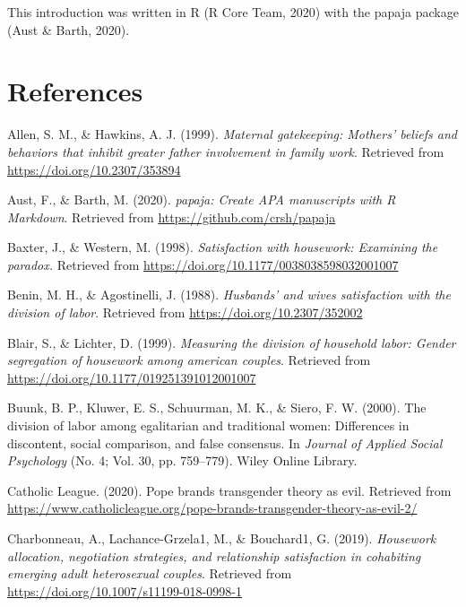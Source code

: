 \documentclass[
  english,
  man]{apa6}
\begin{document}
This introduction was written in R (R Core Team, 2020) with the papaja package (Aust \& Barth, 2020).

\newpage

\hypertarget{references}{%
\section{References}\label{references}}

\hypertarget{refs}{}
\leavevmode\hypertarget{ref-hawkins_1999}{}%
Allen, S. M., \& Hawkins, A. J. (1999). \emph{Maternal gatekeeping: Mothers' beliefs and behaviors that inhibit greater father involvement in family work}. Retrieved from \url{https://doi.org/10.2307/353894}

\leavevmode\hypertarget{ref-R-papaja}{}%
Aust, F., \& Barth, M. (2020). \emph{papaja: Create APA manuscripts with R Markdown}. Retrieved from \url{https://github.com/crsh/papaja}

\leavevmode\hypertarget{ref-baxter_western_1998}{}%
Baxter, J., \& Western, M. (1998). \emph{Satisfaction with housework: Examining the paradox.} Retrieved from \url{https://doi.org/10.1177/0038038598032001007}

\leavevmode\hypertarget{ref-benin_agostinelli_1988}{}%
Benin, M. H., \& Agostinelli, J. (1988). \emph{Husbands' and wives satisfaction with the division of labor}. Retrieved from \url{https://doi.org/10.2307/352002}

\leavevmode\hypertarget{ref-blair_lichter_1999}{}%
Blair, S., \& Lichter, D. (1999). \emph{Measuring the division of household labor: Gender segregation of housework among american couples}. Retrieved from \url{https://doi.org/10.1177/019251391012001007}

\leavevmode\hypertarget{ref-buunk_2000}{}%
Buunk, B. P., Kluwer, E. S., Schuurman, M. K., \& Siero, F. W. (2000). The division of labor among egalitarian and traditional women: Differences in discontent, social comparison, and false consensus. In \emph{Journal of Applied Social Psychology} (No. 4; Vol. 30, pp. 759--779). Wiley Online Library.

\leavevmode\hypertarget{ref-catholic_league_pope_2020}{}%
Catholic League. (2020). Pope brands transgender theory as evil. Retrieved from \url{https://www.catholicleague.org/pope-brands-transgender-theory-as-evil-2/}

\leavevmode\hypertarget{ref-charbonneau_2019}{}%
Charbonneau, A., Lachance-Grzela1, M., \& Bouchard1, G. (2019). \emph{Housework allocation, negotiation strategies, and relationship satisfaction in cohabiting emerging adult heterosexual couples}. Retrieved from \url{https://doi.org/10.1007/s11199-018-0998-1}
\end{document}
